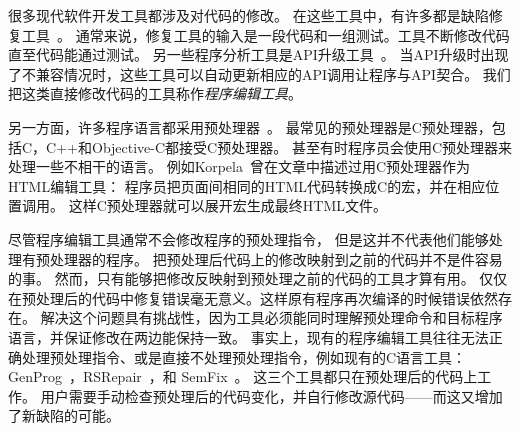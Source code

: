 
\label{sec:intro}


很多现代软件开发工具都涉及对代码的修改。
在这些工具中，有许多都是缺陷修复工具~\parencite{le2012genprog,le2012systematic,QiMLDW14,nguyen2013semfix}。
通常来说，修复工具的输入是一段代码和一组测试。工具不断修改代码直至代码能通过测试。
另一些程序分析工具是API升级工具~\parencite{li2015swin,Padioleau06,Meng:2011}。
当API升级时出现了不兼容情况时，这些工具可以自动更新相应的API调用让程序与API契合。
我们把这类直接修改代码的工具称作\emph{程序编辑工具}。

另一方面，许多程序语言都采用预处理器~\parencite{ernst2002empirical,kohlbecker1986hygienic,lee2012marco}。
最常见的预处理器是C预处理器，包括C，C++和Objective-C都接受C预处理器。
甚至有时程序员会使用C预处理器来处理一些不相干的语言。
例如Korpela~\parencite{Korpela2000}曾在文章中描述过用C预处理器作为HTML编辑工具：
程序员把页面间相同的HTML代码转换成C的宏，并在相应位置调用。
这样C预处理器就可以展开宏生成最终HTML文件。

尽管程序编辑工具通常不会修改程序的预处理指令，
但是这并不代表他们能够处理有预处理器的程序。
把预处理后代码上的修改映射到之前的代码并不是件容易的事。
然而，只有能够把修改反映射到预处理之前的代码的工具才算有用。
仅仅在预处理后的代码中修复错误毫无意义。这样原有程序再次编译的时候错误依然存在。
解决这个问题具有挑战性，因为工具必须能同时理解预处理命令和目标程序语言，并保证修改在两边能保持一致。
事实上，现有的程序编辑工具往往无法正确处理预处理指令、或是直接不处理预处理指令，例如现有的C语言工具：GenProg~\parencite{le2012genprog,le2012systematic}，RSRepair~\parencite{QiMLDW14}，和
SemFix~\parencite{nguyen2013semfix}。
这三个工具都只在预处理后的代码上工作。
用户需要手动检查预处理后的代码变化，并自行修改源代码——而这又增加了新缺陷的可能。

